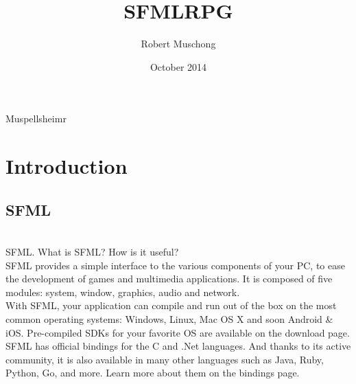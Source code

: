 \documentclass{article}
\title{SFMLRPG}
\author{Robert Muschong}
\date{October 2014}
\begin{document}
	\maketitle
	Muspellsheimr
\\
\section{Introduction}
	\subsection{SFML}
\\
SFML. What is SFML? How is it useful?
\\
SFML provides a simple interface to the various components of your PC, to ease
the development of games and multimedia applications. It is composed of five 
modules: system, window, graphics, audio and network.
\\
With SFML, your application can compile and run out of the box on the most common
operating systems: Windows, Linux, Mac OS X and soon Android & iOS. Pre-compiled 
SDKs for your favorite OS are available on the download page.
\\
SFML has official bindings for the C and .Net languages. And thanks to its active
community, it is also available in many other languages such as Java, Ruby, Python,
Go, and more. Learn more about them on the bindings page.
\\
\end{document}
